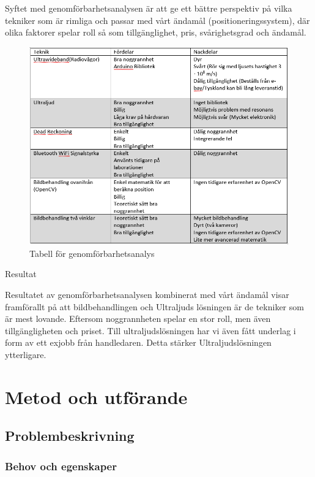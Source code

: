 \documentclass[11pt, a4paper]{report}
\begin{document}
Syftet med genomförbarhetsanalysen är att ge ett bättre perspektiv på vilka tekniker som är rimliga och passar med vårt ändamål (positioneringssystem), där olika faktorer spelar roll så som tillgänglighet, pris, svårighetsgrad och ändamål.


\begin{figure}[H]
	\begin{center}
		\includegraphics[width=15cm]{genomforbarhetsanalys.PNG}
		\caption{Tabell för genomförbarhetsanalys}
		\label{fig:genomforbarhetsanalys}
	\end{center}
\end{figure}

Resultat

Resultatet av genomförbarhetsanalysen kombinerat med vårt ändamål visar framförallt på att bildbehandlingen och Ultraljuds lösningen är de tekniker som är mest lovande. Eftersom noggrannheten spelar en stor roll, men även tillgängligheten och priset. Till ultraljudslösningen har vi även fått underlag i form av ett exjobb från handledaren. Detta stärker Ultraljudslösningen ytterligare.

\chapter{Metod och utförande}

\section{Problembeskrivning}

\subsection{Behov och egenskaper}
\end{document}
